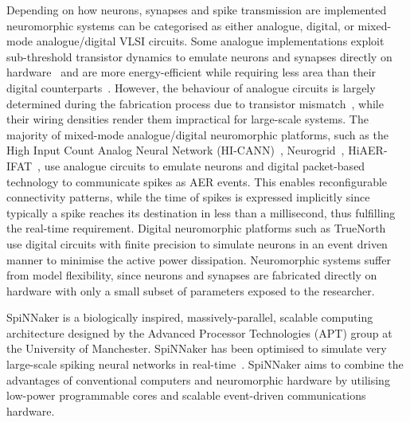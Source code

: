 Depending on how neurons, synapses and spike transmission are implemented neuromorphic systems can be categorised as either analogue, digital, or mixed-mode analogue/digital VLSI circuits. Some analogue implementations exploit sub-threshold transistor dynamics to emulate neurons and synapses directly on hardware~\citep{indiveri2011neuromorphic} and are more energy-efficient while requiring less area than their digital counterparts~\citep{joubert2012hardware}. However, the behaviour of analogue circuits is largely determined during the fabrication process due to transistor mismatch~\citep{indiveri2011neuromorphic,pedram2006thermal,linares2003compact}, while their wiring densities render them impractical for large-scale systems. The majority of mixed-mode analogue/digital neuromorphic platforms, such as the High Input Count Analog Neural Network (HI-CANN)~\citep{schemmel2010wafer}, Neurogrid~\citep{benjamin2014neurogrid}, HiAER-IFAT~\citep{yu201265k}, use analogue circuits to emulate neurons and digital packet-based technology to communicate spikes as AER events. This enables reconfigurable connectivity patterns, while the time of spikes is expressed implicitly since typically a spike reaches its destination in less than a millisecond, thus fulfilling the real-time requirement. Digital neuromorphic platforms such as TrueNorth~\citep{merolla2014million} use digital circuits with finite precision to simulate neurons in an event driven manner to minimise the active power dissipation. Neuromorphic systems suffer from model flexibility, since neurons and synapses are fabricated directly on hardware with only a small subset of parameters exposed to the researcher. 

SpiNNaker is a biologically inspired, massively-parallel, scalable computing architecture designed by the Advanced Processor Technologies (APT) group at the University of Manchester. SpiNNaker has been optimised to simulate very large-scale spiking neural networks in real-time~\citep{furber2014spinnaker}. SpiNNaker aims to combine the advantages of conventional computers and neuromorphic hardware by utilising low-power programmable cores and scalable event-driven communications hardware.


